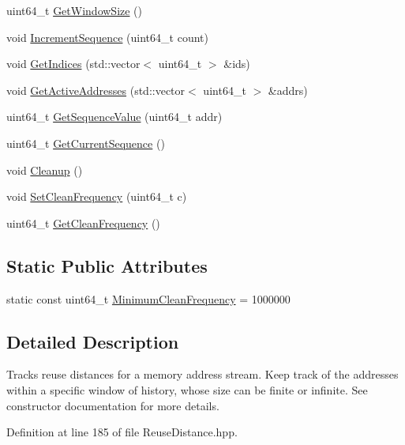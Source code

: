 \begin{DoxyCompactItemize}
\item 
uint64\_\-t \hyperlink{class_reuse_distance_a174706aa3697f068cc4d1534948d7786}{GetWindowSize} ()
\item 
void \hyperlink{class_reuse_distance_a0c6e2709575d716c1ac659a266164163}{IncrementSequence} (uint64\_\-t count)
\item 
void \hyperlink{class_reuse_distance_a99fb4b3aae663676515ad354691b7cc6}{GetIndices} (std::vector$<$ uint64\_\-t $>$ \&ids)
\item 
void \hyperlink{class_reuse_distance_acc4885040a8a518fc10b5aa4da7d777a}{GetActiveAddresses} (std::vector$<$ uint64\_\-t $>$ \&addrs)
\item 
uint64\_\-t \hyperlink{class_reuse_distance_ac849305d7ca15a5099956d0a89c929a7}{GetSequenceValue} (uint64\_\-t addr)
\item 
uint64\_\-t \hyperlink{class_reuse_distance_a5e88535f0b223c0e6d6ab1f4a1aa29ba}{GetCurrentSequence} ()
\item 
void \hyperlink{class_reuse_distance_a6f56cdb0f1e6958173398e134556a5ab}{Cleanup} ()
\item 
void \hyperlink{class_reuse_distance_a26ca9122b91b17f298bdb9cbe44a6d63}{SetCleanFrequency} (uint64\_\-t c)
\item 
uint64\_\-t \hyperlink{class_reuse_distance_a2dd5a5a59a4cb8172ab9f9d2ae72ba85}{GetCleanFrequency} ()
\end{DoxyCompactItemize}
\subsection*{Static Public Attributes}
\begin{DoxyCompactItemize}
\item 
static const uint64\_\-t \hyperlink{class_reuse_distance_a3aebe8066043c0875b427418a8326a3a}{MinimumCleanFrequency} = 1000000
\end{DoxyCompactItemize}


\subsection{Detailed Description}
Tracks reuse distances for a memory address stream. Keep track of the addresses within a specific window of history, whose size can be finite or infinite. See constructor documentation for more details. 

Definition at line 185 of file ReuseDistance.hpp.



